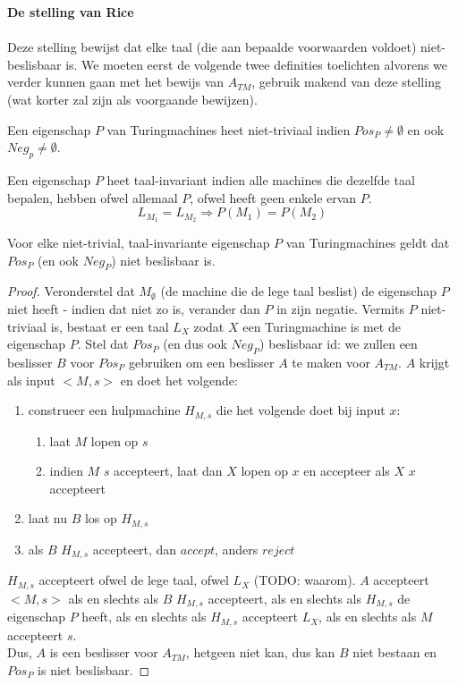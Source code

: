 \documentclass[
10pt,
a4paper,
oneside,
headinclude,footinclude, 
BCOR5mm,
]{scrartcl}
\begin{document}
\textbf{De stelling van Rice} \vspace{-1mm} \\ \\
Deze stelling bewijst dat elke taal (die aan bepaalde voorwaarden voldoet) niet-beslisbaar is. We moeten eerst de volgende twee definities toelichten alvorens we verder kunnen gaan met het bewijs van $A_{TM}$, gebruik makend van deze stelling (wat korter zal zijn als voorgaande bewijzen).

\begin{theorem}
	Een eigenschap $P$ van Turingmachines heet niet-triviaal indien $Pos_P \neq \emptyset$ en ook $Neg_p \neq \emptyset$.
\end{theorem}

\begin{theorem}
	Een eigenschap $P$ heet taal-invariant indien alle machines die dezelfde taal bepalen, hebben ofwel allemaal $P$, ofwel heeft geen enkele ervan $P$. \\
	 $$L_{M_1} = L_{M_2} \Rightarrow P(M_1) = P(M_2)$$
\end{theorem}

\begin{theorem}
	Voor elke niet-trivial, taal-invariante eigenschap $P$ van Turingmachines geldt dat $Pos_P$ (en ook $Neg_P$) niet beslisbaar is.
\end{theorem}

\begin{proof}
	Veronderstel dat $M_\emptyset$ (de machine die de lege taal beslist) de eigenschap $P$ niet heeft - indien dat niet zo is, verander dan $P$ in zijn negatie. Vermits $P$ niet-triviaal is, bestaat er een taal $L_X$ zodat $X$ een Turingmachine is met de eigenschap $P$. Stel dat $Pos_P$ (en dus ook $Neg_P$) beslisbaar id: we zullen een beslisser $B$ voor $Pos_P$ gebruiken om een beslisser $A$ te maken voor $A_{TM}$. $A$ krijgt als input $<M,s>$ en doet het volgende:
	\begin{enumerate}
		\item construeer een hulpmachine $H_{M,s}$ die het volgende doet bij input $x$:
		\begin{enumerate}
			\item laat $M$ lopen op $s$
			\item indien $M$ $s$ accepteert, laat dan $X$ lopen op $x$ en accepteer als $X$ $x$ accepteert
		\end{enumerate}
		\item laat nu $B$ los op $H_{M,s}$
		\item als $B$ $H_{M,s}$ accepteert, dan $accept$, anders $reject$
	\end{enumerate}
	$H_{M,s}$ accepteert ofwel de lege taal, ofwel $L_X$ (TODO: waarom). $A$ accepteert $<M,s>$ als en slechts als $B$ $H_{M,s}$ accepteert, als en slechts als $H_{M,s}$ de eigenschap $P$ heeft, als en slechts als $H_{M,s}$ accepteert $L_X$, als en slechts als $M$ accepteert $s$.\\
	Dus, $A$ is een beslisser voor $A_{TM}$, hetgeen niet kan, dus kan $B$ niet bestaan en $Pos_P$ is niet beslisbaar.
\end{proof}
\end{document}
